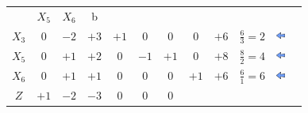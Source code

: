 \documentclass{beamer}
\begin{document}
\begin{frame}
{\begin{table}
\begin{tabular}{c c c c c c c c c c c c}
				&\cellcolor{blue!100} \color{red}   $\scriptstyle X_5$ 
				&\cellcolor{blue!100} \color{red}   $\scriptstyle X_6$ 
				&\cellcolor{blue!100} \color{white} \scriptsize b \\
				\cellcolor{blue!100} \color{red} $\scriptstyle X_3$
				& \cellcolor{yellow!50} $\scriptstyle 0$
				& \cellcolor{yellow!50} $\scriptstyle -2$
				& \cellcolor{gray!50} $\scriptstyle +3$
				& \cellcolor{yellow!50} $\scriptstyle +1$
				& \cellcolor{yellow!50} $\scriptstyle 0$
				& \cellcolor{yellow!50} $\scriptstyle 0$
				& \cellcolor{yellow!50} $\scriptstyle 0$
				& \cellcolor{gray!50} $\scriptstyle +6$ 
				& $ \scriptstyle \frac{6}{3} = 2$
				& \includegraphics[width=0.3cm,height=0.3cm]{setaesquerda.jpg} \\
			    \cellcolor{blue!100} \color{red} $\scriptstyle X_5$
				& \cellcolor{yellow!50} $\scriptstyle 0$
				& \cellcolor{yellow!50} $\scriptstyle +1$
				& \cellcolor{gray!50} $\scriptstyle +2$
				& \cellcolor{yellow!50} $\scriptstyle 0$			
				& \cellcolor{yellow!50} $\scriptstyle -1$
				& \cellcolor{yellow!50} $\scriptstyle +1$
				& \cellcolor{yellow!50} $\scriptstyle 0$ 
				& \cellcolor{gray!50} $\scriptstyle +8$ 
				& $ \scriptstyle \frac{8}{2} = 4$ 
				& \includegraphics[width=0.3cm,height=0.3cm]{setaesquerda.jpg}\\
				\cellcolor{blue!100} \color{red} $\scriptstyle X_6$
				& \cellcolor{yellow!50} $\scriptstyle 0$
				& \cellcolor{yellow!50} $\scriptstyle +1$
				& \cellcolor{gray!50} $\scriptstyle +1$
				& \cellcolor{yellow!50} $\scriptstyle 0$
				& \cellcolor{yellow!50} $\scriptstyle 0$
				& \cellcolor{yellow!50} $\scriptstyle 0$
				& \cellcolor{yellow!50} $\scriptstyle +1$
				& \cellcolor{gray!50} $\scriptstyle +6$
				& $ \scriptstyle \frac{6}{1} = 6$ 
				& \includegraphics[width=0.3cm,height=0.3cm]{setaesquerda.jpg}\\
				\cellcolor{blue!100} \color{white} $\scriptstyle Z$
				& \cellcolor{yellow!50} $\scriptstyle +1$
				& \cellcolor{yellow!50} $\scriptstyle -2$
				& \cellcolor{gray!50} $\scriptstyle -3$
				& \cellcolor{yellow!50} $\scriptstyle 0$
				& \cellcolor{yellow!50} $\scriptstyle 0$
				& \cellcolor{yellow!50} $\scriptstyle 0$

\end{tabular}
\end{table}}
\end{frame}
\end{document}
